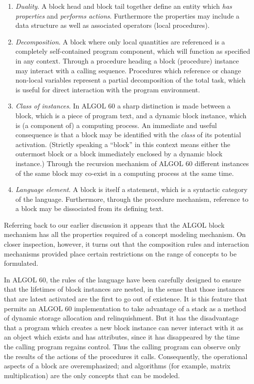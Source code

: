 \documentclass[twoside,11pt]{book}
\begin{document}
\begin{enumerate}[wide, nosep, label=(\arabic*)]
	\item \textit{Duality}. A block head and block tail together define an entity which \textit{has properties} and \textit{performs actions}. Furthermore the properties may include a data structure as well as associated operators (local procedures).
	
	\item \textit{Decomposition}. A block where only local quantities are referenced is a completely self-contained program component, which will function as specified in any context. Through a procedure heading a block (procedure) instance may interact with a calling sequence. Procedures which reference or change non-local variables represent a partial decomposition of the total task, which is useful for direct interaction with the program environment.

	\item \textit{Class of instances}. In ALGOL 60 a sharp distinction is made between a block, which is a piece of program text, and a dynamic block instance, which is (a component of) a computing process. An immediate and useful consequence is that a block may be identified with the \textit{class} of its potential activation. (Strictly speaking a ``block'' in this context means either the outermost block or a block immediately enclosed by a dynamic block instance.) Through the recursion mechanism of ALGOL 60 different instances of the same block may co-exist in a computing process at the same time.

	\item \textit{Language element}. A block is itself a statement, which is a syntactic category of the language. Furthermore, through the procedure mechanism, reference to a block may be dissociated from its defining text.
\end{enumerate}

Referring back to our earlier discussion it appears that the ALGOL block mechanism has all the properties required of a concept modeling mechanism. On closer inspection, however, it turns out that the composition rules and interaction mechanisms provided place certain restrictions on the range of concepts to be formulated.

In ALGOL 60, the rules of the language have been carefully designed to ensure that the lifetimes of block instances are nested, in the sense that those instances that are latest activated are the first to go out of existence. It is this feature that permits an ALGOL 60 implementation to take advantage of a stack as a method of dynamic storage allocation and relinquishment. But it has the disadvantage that a program which creates a new block instance can never interact with it as an object which exists and has attributes, since it has disappeared by the time the calling program regains control. Thus the calling program can observe only the results of the actions of the procedures it calls. Consequently, the operational aspects of a block are overemphasized; and algorithms (for example, matrix multiplication) are the only concepts that can be modeled.
\end{document}
